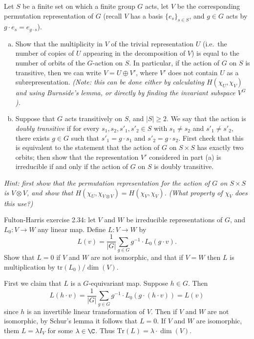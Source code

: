\documentclass[11pt,letterpaper]{article}
\begin{document}
\pagebreak
\begin{problem}
    Let $S$ be a finite set on which a finite group $G$ acts, let $V$ be the corresponding permutation representation of $G$ (recall $V$ has a basis $\{e_s\}_{s\in S}$, and $g\in G$ acts by $g\cdot e_s=e_{g\cdot s}$).
    \begin{enumerate}[(a)]
        \item Show that the multiplicity in $V$ of the trivial representation $U$ (i.e.\ the number of copies of $U$ appearing in the decomposition of $V$) is equal to the number of orbits of the $G$-action on $S$.  In particular, if the action of $G$ on $S$ is transitive, then we can write $V=U\oplus V'$, where $V'$ does not contain $U$ as a subrepresentation.
            \textit{(Note: this can be done either by calculating $H(\chi_U,\chi_V)$ and using Burnside's lemma, or directly by finding the invariant subspace $V^G$).}
        \item Suppose that $G$ acts transitively on $S$, and $|S|\geq 2$. We say that the action is {\em doubly transitive} if for every $s_1,s_2,s'_1,s'_2\in S$ with $s_1\neq s_2$ and $s'_1\neq s'_2$, there exists $g\in G$ such that $s'_1=g\cdot s_1$ and $s'_2=g\cdot s_2$. First check that this is equivalent to the statement that the action of $G$ on $S\times S$ has exactly two orbits; then show that the representation $V'$ considered in part (a) is irreducible if and only if the action of $G$ on $S$ is doubly transitive.
    \end{enumerate}
\end{problem}
\textit{Hint: first show that the permutation representation for the action of $G$ on
$S\times S$ is $V\otimes V$, and show that $H(\chi_U,\chi_{V\otimes V})=
H(\chi_V,\chi_V)$. (What property of $\chi_V$ does this use?)}

\pagebreak
\begin{problem}
    Fulton-Harris exercise 2.34: let $V$ and $W$ be irreducible representations of $G$, and $L_0:V\to W$ any linear map. Define $L:V\to W$ by $$L(v)=\frac{1}{|G|}\sum_{g\in G} g^{-1}\cdot L_0(g\cdot v).$$ Show that $L=0$ if $V$ and $W$ are not isomorphic, and that if $V=W$ then $L$ is multiplication by $\mathrm{tr}(L_0)/\dim(V)$.
\end{problem}

First we claim that $L$ is a $G$-equivariant map. Suppose $h\in G$. Then
\[
    L(h\cdot v)=\frac{1}{|G|}\sum_{g\in G} g^{-1}\cdot L_0(g\cdot (h\cdot v))= L(v)
\]
since $h$ is an invertible linear transformation of $V$. Then if $V$ and $W$ are not isomorphic, by Schur's lemma it follows that $L=0$. If $V$ and $W$ are isomorphic, them $L=\lambda I_V$ for some $\lambda \in \C$. Thus $\mathrm{Tr}(L)=\lambda \cdot \dim(V)$.  
\end{document}
